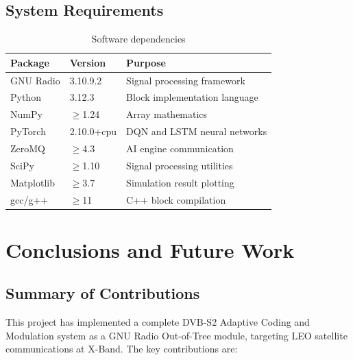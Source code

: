 \documentclass[12pt,a4paper]{report}
\begin{document}
\section{System Requirements}

\begin{table}[H]
\centering
\caption{Software dependencies}
\label{tab:deps}
\begin{tabular}{lll}
\toprule
\textbf{Package}  & \textbf{Version}   & \textbf{Purpose} \\
\midrule
GNU Radio         & 3.10.9.2           & Signal processing framework \\
Python            & 3.12.3             & Block implementation language \\
NumPy             & $\geq$1.24         & Array mathematics \\
PyTorch           & 2.10.0+cpu         & DQN and LSTM neural networks \\
ZeroMQ            & $\geq$4.3          & AI engine communication \\
SciPy             & $\geq$1.10         & Signal processing utilities \\
Matplotlib        & $\geq$3.7          & Simulation result plotting \\
gcc/g++           & $\geq$11           & C++ block compilation \\
\bottomrule
\end{tabular}
\end{table}

\chapter{Conclusions and Future Work}

\section{Summary of Contributions}

This project has implemented a complete DVB-S2 Adaptive Coding and Modulation
system as a GNU Radio Out-of-Tree module, targeting LEO satellite communications
at X-Band. The key contributions are:
\end{document}
